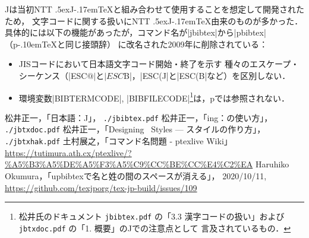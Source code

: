\documentclass[a4paper,11pt,nomag,dvipdfmx]{jsarticle}
\def\file#1{\texttt{#1}}
\def\pTeX{p\kern-.10em\TeX}
\def\JTeX{\leavevmode\textcompwordmark\lower.5ex\hbox{J}\kern-.17em\TeX}
\def\JBibTeX{\leavevmode\textcompwordmark\lower.5ex\hbox{J}\kern-.08em\BibTeX}
\def\pBibTeX{p\kern-.05em\BibTeX}
\def\JBibTeX{J\BibTeX}%
\def\pBibTeX{p\BibTeX}%
\begin{document}
\JBibTeX は当初NTT \JTeX と組み合わせて使用することを想定して開発されたため，
文字コードに関する扱いにNTT \JTeX 由来のものが多かった．
具体的には以下の機能があったが，コマンド名が|jbibtex|から|pbibtex|（\pTeX と同じ接頭辞）
に改名された2009年に削除されている\cite{ptexlive}：
\begin{itemize}
 \item JISコードにおいて日本語文字コード開始・終了を示す
  種々のエスケープ・シーケンス（|ESC$@|と|ESC$B|，|ESC(J|と|ESC(B|など）を区別しない．
 \item 環境変数|BIBTERMCODE|, |BIBFILECODE|\footnote{松井氏のドキュメント
  \file{jbibtex.pdf} \cite{jbibtex}の「3.3 漢字コードの扱い」および
  \file{jbtxdoc.pdf} \cite{jbtxdoc}の「1. 概要」の\JBibTeX での注意点として
  言及されているもの．}は，\pBibTeX では参照されない．
\end{itemize}


\clearpage
\begin{thebibliography}{99}
  松井正一，「日本語\BibTeX ：\JBibTeX」，
  \file{./jbibtex.pdf}
  松井正一，「\BibTeX ing：\BibTeX の使い方」，
  \file{./jbtxdoc.pdf}
  松井正一，「Designing \BibTeX\ Styles --- \BibTeX スタイルの作り方」，
  \file{./jbtxhak.pdf}
  土村展之，「コマンド名問題 - ptexlive Wiki」\\
  \url{https://tutimura.ath.cx/ptexlive/?%A5%B3%A5%DE%A5%F3%A5%C9%CC%BE%CC%E4%C2%EA}
  Haruhiko Okumura，「upbibtexで名と姓の間のスペースが消える」，
  2020/10/11,\\
  \url{https://github.com/texjporg/tex-jp-build/issues/109}
\end{thebibliography}
\end{document}
